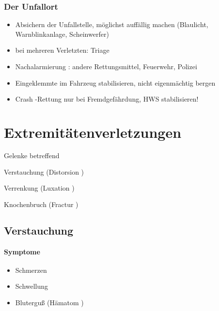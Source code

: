 \subsubsection{Der Unfallort}

\begin{itemize}
    \item Absichern  der Unfallstelle,  m\"oglichst auff\"allig machen (Blaulicht,
 Warnblinkanlage, Scheinwerfer)
 \item bei mehreren Verletzten: Triage
 \item Nachalarmierung : andere  Rettungsmittel, Feuerwehr, Polizei
 \item Eingeklemmte im Fahrzeug stabilisieren,  nicht eigenm\"achtig bergen
 \item Crash -Rettung nur  bei  Fremdgef\"ahrdung, HWS stabilisieren!
\end{itemize}




\section{Extremit\"atenverletzungen}
Gelenke betreffend

Verstauchung (Distorsion )

Verrenkung (Luxation )

Knochenbruch (Fractur )

\subsection{Verstauchung}

\paragraph{Symptome}
\begin{itemize}
    \item Schmerzen
    \item Schwellung
    \item Blutergu{\ss} (H\"amatom )
\end{itemize}



